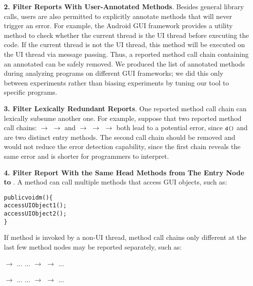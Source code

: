 \textbf{2. Filter Reports With User-Annotated Methods}. Besides general
library calls, users are also permitted to explicitly annotate methods
that will never trigger an error.
For example, the Android GUI framework provides a utility method 
 to check whether the current thread is the UI thread
before executing the code. If the current thread is not the UI thread,
this method will be executed on the UI thread via message passing.
Thus, a reported method call chain containing an annotated 
can be safely removed. We produced the list of annotated methods
during analyzing programs on different GUI frameworks; we did this
only between experiments rather than biasing experiments by tuning
our tool to specific programs.

\textbf{3. Filter Lexically Redundant Reports}. One reported method call
chain can lexically subsume another one. For example, suppose that two
reported method call chains:  $\rightarrow$ 
$\rightarrow$  and 
 $\rightarrow$  $\rightarrow$  $\rightarrow$ 
both lead to a potential error, since $\CodeIn{d()}$ and 
are two distinct entry methods. The second call chain should
be removed and would not reduce the error detection capability, since
the first chain reveals the same error and is shorter 
for programmers to interpret.


\textbf{4. Filter Report With the Same Head Methods from The Entry Node to }. A method can call
multiple methods that access GUI objects, such as:
\vspace{-1mm}
\begin{CodeOut}
\begin{alltt}
     public void m() \{
         accessUIObject1();
         accessUIObject2();
     \}
\end{alltt}
\end{CodeOut}
If method  is invoked by a non-UI thread, method call chains
only different at the last few method nodes may be reported separately, such as:

 $\rightarrow$ ... ... $\rightarrow$  $\rightarrow$  ...

 $\rightarrow$ ... ... $\rightarrow$  $\rightarrow$  ...

